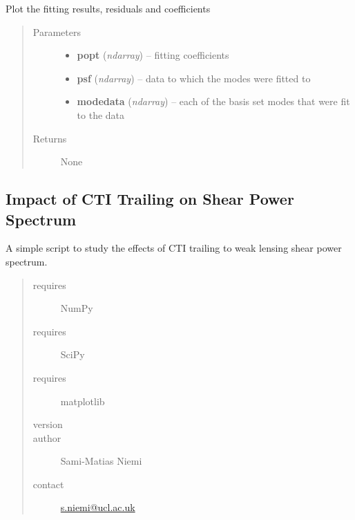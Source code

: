\documentclass[a4paper,11pt,english]{sphinxmanual}
\begin{document}
\begin{fulllineitems}
\label{analysis:analysis.fitPSF.visualise}
Plot the fitting results, residuals and coefficients
\begin{quote}\begin{description}
\item[{Parameters}] \leavevmode\begin{itemize}
\item {} 
\textbf{popt} (\emph{ndarray}) -- fitting coefficients

\item {} 
\textbf{psf} (\emph{ndarray}) -- data to which the modes were fitted to

\item {} 
\textbf{modedata} (\emph{ndarray}) -- each of the basis set modes that were fit to the data

\end{itemize}

\item[{Returns}] \leavevmode
None

\end{description}\end{quote}

\end{fulllineitems}

\label{analysis:module-analysis.CTIpower}

\subsection{Impact of CTI Trailing on Shear Power Spectrum}
\label{analysis:impact-of-cti-trailing-on-shear-power-spectrum}
A simple script to study the effects of CTI trailing to weak lensing shear power spectrum.
\begin{quote}\begin{description}
\item[{requires}] \leavevmode
NumPy

\item[{requires}] \leavevmode
SciPy

\item[{requires}] \leavevmode
matplotlib

\item[{version}] 

\item[{author}] \leavevmode
Sami-Matias Niemi

\item[{contact}] \leavevmode
\href{mailto:s.niemi@ucl.ac.uk}{s.niemi@ucl.ac.uk}

\end{description}\end{quote}
\end{document}
